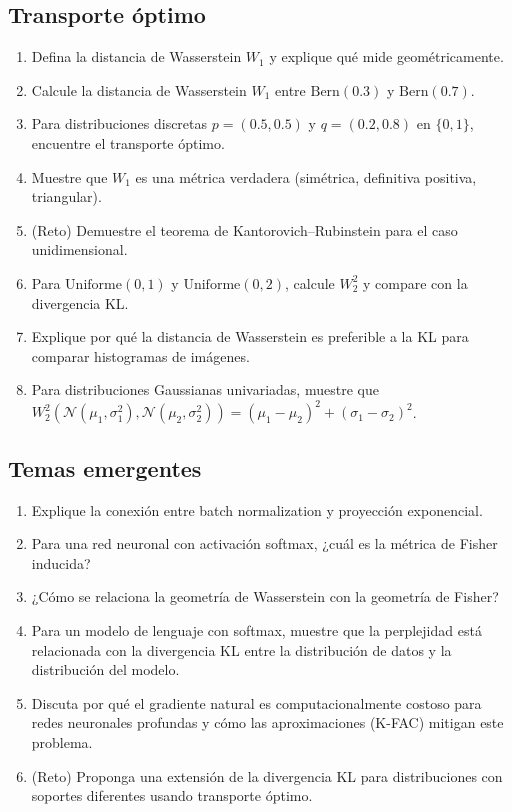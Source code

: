 \subsection*{Transporte óptimo}
\begin{enumerate}[resume]
	\item[$\star$] Defina la distancia de Wasserstein $W_1$ y explique qué mide geométricamente.
	\item[$\star\star$] Calcule la distancia de Wasserstein $W_1$ entre $\mathrm{Bern}(0.3)$ y $\mathrm{Bern}(0.7)$.
	\item[$\star\star$] Para distribuciones discretas $p = (0.5, 0.5)$ y $q = (0.2, 0.8)$ en $\{0, 1\}$, encuentre el transporte óptimo.
	\item[$\star\star\star$] Muestre que $W_1$ es una métrica verdadera (simétrica, definitiva positiva, triangular).
	\item[$\star\star\star\star$] (Reto) Demuestre el teorema de Kantorovich--Rubinstein para el caso unidimensional.
	\item[$\star\star\star$] Para $\mathrm{Uniforme}(0,1)$ y $\mathrm{Uniforme}(0,2)$, calcule $W_2^2$ y compare con la divergencia KL.
	\item[$\star\star$] Explique por qué la distancia de Wasserstein es preferible a la KL para comparar histogramas de imágenes.
	\item[$\star\star\star$] Para distribuciones Gaussianas univariadas, muestre que $W_2^2(\mathcal{N}(\mu_1, \sigma_1^2), \mathcal{N}(\mu_2, \sigma_2^2)) = (\mu_1 - \mu_2)^2 + (\sigma_1 - \sigma_2)^2$.
\end{enumerate}

\subsection*{Temas emergentes}
\begin{enumerate}[resume]
	\item[$\star$] Explique la conexión entre batch normalization y proyección exponencial.
	\item[$\star$] Para una red neuronal con activación softmax, ¿cuál es la métrica de Fisher inducida?
	\item[$\star$] ¿Cómo se relaciona la geometría de Wasserstein con la geometría de Fisher?
	\item[$\star\star\star$] Para un modelo de lenguaje con softmax, muestre que la perplejidad está relacionada con la divergencia KL entre la distribución de datos y la distribución del modelo.
	\item[$\star\star\star$] Discuta por qué el gradiente natural es computacionalmente costoso para redes neuronales profundas y cómo las aproximaciones (K-FAC) mitigan este problema.
	\item[$\star\star\star\star$] (Reto) Proponga una extensión de la divergencia KL para distribuciones con soportes diferentes usando transporte óptimo.
\end{enumerate}

